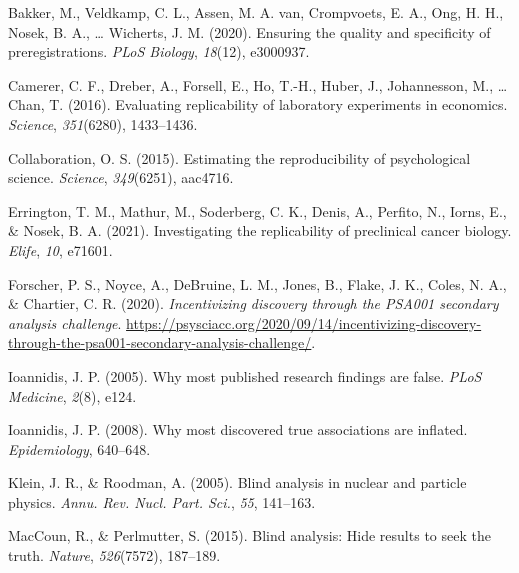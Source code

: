 \documentclass[
  man,floatsintext]{apa6}
\newlength{\cslhangindent}
\newlength{\cslentryspacingunit} %
\newenvironment{CSLReferences}[2] %
 {%
  \setlength{\parindent}{0pt}
  \ifodd #1
  \let\oldpar\par
  \def\par{\hangindent=\cslhangindent\oldpar}
  \fi
  \setlength{\parskip}{#2\cslentryspacingunit}
 }%
 {}
\begin{document}
\hypertarget{refs}{}
\begin{CSLReferences}{1}{0}
\leavevmode{}%
Bakker, M., Veldkamp, C. L., Assen, M. A. van, Crompvoets, E. A., Ong, H. H., Nosek, B. A., \ldots{} Wicherts, J. M. (2020). Ensuring the quality and specificity of preregistrations. \emph{PLoS Biology}, \emph{18}(12), e3000937.

\leavevmode{}%
Camerer, C. F., Dreber, A., Forsell, E., Ho, T.-H., Huber, J., Johannesson, M., \ldots{} Chan, T. (2016). Evaluating replicability of laboratory experiments in economics. \emph{Science}, \emph{351}(6280), 1433--1436.

\leavevmode{}%
Collaboration, O. S. (2015). Estimating the reproducibility of psychological science. \emph{Science}, \emph{349}(6251), aac4716.

\leavevmode{}%
Errington, T. M., Mathur, M., Soderberg, C. K., Denis, A., Perfito, N., Iorns, E., \& Nosek, B. A. (2021). Investigating the replicability of preclinical cancer biology. \emph{Elife}, \emph{10}, e71601.

\leavevmode{}%
Forscher, P. S., Noyce, A., DeBruine, L. M., Jones, B., Flake, J. K., Coles, N. A., \& Chartier, C. R. (2020). \emph{Incentivizing discovery through the {PSA001} secondary analysis challenge}. \url{https://psysciacc.org/2020/09/14/incentivizing-discovery-through-the-psa001-secondary-analysis-challenge/}.

\leavevmode{}%
Ioannidis, J. P. (2005). Why most published research findings are false. \emph{PLoS Medicine}, \emph{2}(8), e124.

\leavevmode{}%
Ioannidis, J. P. (2008). Why most discovered true associations are inflated. \emph{Epidemiology}, 640--648.

\leavevmode{}%
Klein, J. R., \& Roodman, A. (2005). Blind analysis in nuclear and particle physics. \emph{Annu. Rev. Nucl. Part. Sci.}, \emph{55}, 141--163.

\leavevmode{}%
MacCoun, R., \& Perlmutter, S. (2015). Blind analysis: {Hide} results to seek the truth. \emph{Nature}, \emph{526}(7572), 187--189.


\end{CSLReferences}
\end{document}
